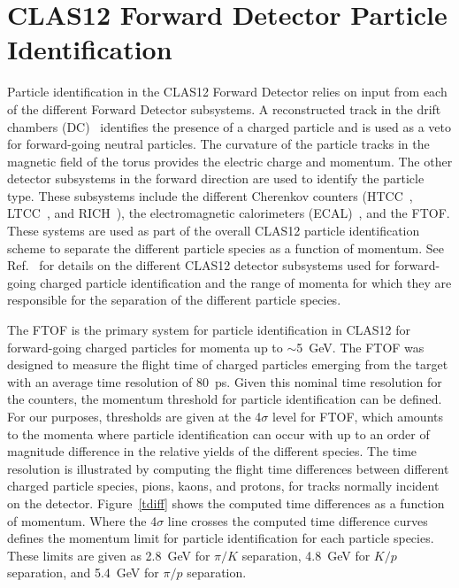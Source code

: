 \documentclass[final,3p,twocolumn]{elsarticle}
\begin{document}
\section{CLAS12 Forward Detector Particle Identification}
\label{clas12-fd-pid}

Particle identification in the CLAS12 Forward Detector relies on input from each of the different Forward
Detector subsystems. A reconstructed track in the drift chambers (DC)~\cite{dc-nim} identifies the
presence of a charged particle and is used as a veto for forward-going neutral particles. The curvature
of the particle tracks in the magnetic field of the torus provides the electric charge and momentum.
The other detector subsystems in the forward direction are used to identify the particle type. These
subsystems include the different Cherenkov counters (HTCC~\cite{htcc-nim}, LTCC~\cite{ltcc-nim}, and
RICH~\cite{rich-nim}), the electromagnetic calorimeters (ECAL)~\cite{ec-nim}, and the FTOF. These
systems are used as part of the overall CLAS12 particle identification scheme to separate the different
particle species as a function of momentum. See Ref.~\cite{clas12-nim} for details on the different
CLAS12 detector subsystems used for forward-going charged particle identification and the range of
momenta for which they are responsible for the separation of the different particle species.

The FTOF is the primary system for particle identification in CLAS12 for forward-going charged particles
for momenta up to $\sim$5~GeV. The FTOF  was designed to measure the flight time of charged particles
emerging from the target with an average time resolution of 80~ps. Given this nominal time resolution for the
counters, the momentum threshold for particle identification can be defined. For our purposes, thresholds are
given at the 4$\sigma$ level for FTOF, which amounts to the momenta where particle identification can occur
with up to an order of magnitude difference in the relative yields of the different species. The time resolution
is illustrated by computing the flight time differences between different charged particle species, pions,
kaons, and protons, for tracks normally incident on the detector. Figure~\ref{tdiff} shows the computed time
differences as a function of momentum. Where the 4$\sigma$ line crosses the computed time difference
curves defines the momentum limit for particle identification for each particle species. These limits are given
as 2.8~GeV for $\pi/K$ separation, 4.8~GeV for $K/p$ separation, and 5.4~GeV for $\pi/p$ separation.  
\end{document}
